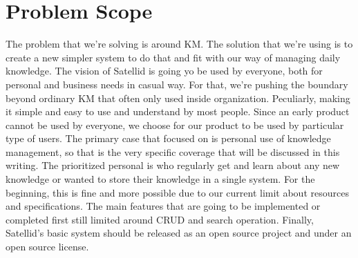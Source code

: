 \section{Problem Scope}
\label{sec:problem-scope}

The problem that we're solving is around \ac{KM}.
The solution that we're using is to create a new simpler system to do that and fit with our way of managing daily knowledge.
The vision of Satellid is going yo be used by everyone, both for personal and business needs in casual way.
For that, we're pushing the boundary beyond ordinary \ac{KM} that often only used inside organization.
Peculiarly, making it simple and easy to use and understand by most people.
Since an early product cannot be used by everyone, we choose for our product to be used by particular type of users.
The primary case that focused on is personal use of knowledge management, so that is the very specific coverage that will be discussed in this writing.
The prioritized personal is who regularly get and learn about any new knowledge or wanted to store their knowledge in a single system.
For the beginning, this is fine and more possible due to our current limit about resources and specifications.
The main features that are going to be implemented or completed first still limited around \ac{CRUD} and search operation.
Finally, Satellid's basic system should be released as an open source project and under an open source license.
